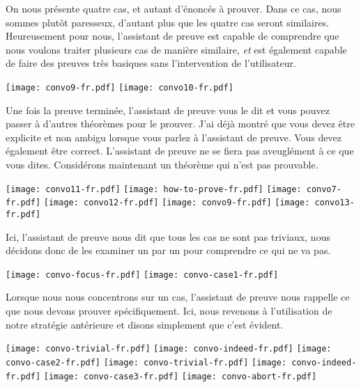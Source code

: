 On nous présente quatre cas, et autant d'énoncés à prouver.
Dans ce cas, nous sommes plutôt paresseux, d'autant plus que les quatre cas
seront similaires. Heureusement pour nous, l'assistant de preuve est capable de
comprendre que nous voulons traiter plusieurs cas de manière similaire,
\emph{et} est également capable de faire des preuves très basiques sans
l'intervention de l'utilisateur.

\begin{center}
  \texttt{[image: convo9-fr.pdf]}
  \texttt{[image: convo10-fr.pdf]}
\end{center}

Une fois la preuve terminée, l'assistant de preuve vous le dit et vous pouvez
passer à d'autres théorèmes pour le prouver. J'ai déjà montré que vous devez
être explicite et non ambigu lorsque vous parlez à l'assistant de preuve. Vous
devez également être correct.
L'assistant de preuve ne se fiera pas aveuglément à ce que vous dites.
%
Considérons maintenant un théorème qui n'est pas prouvable.

\begin{center}
  \texttt{[image: convo11-fr.pdf]}
  \texttt{[image: how-to-prove-fr.pdf]}
  \texttt{[image: convo7-fr.pdf]}
  \texttt{[image: convo12-fr.pdf]}
  \texttt{[image: convo9-fr.pdf]}
  \texttt{[image: convo13-fr.pdf]}
\end{center}

Ici, l'assistant de preuve nous dit que tous les cas ne sont pas triviaux, nous
décidons donc de les examiner un par un pour comprendre ce qui ne va pas.

\begin{center}
  \texttt{[image: convo-focus-fr.pdf]}
  \texttt{[image: convo-case1-fr.pdf]}
\end{center}

Lorsque nous nous concentrons sur un cas, l'assistant de preuve nous rappelle ce
que nous devons prouver spécifiquement. Ici, nous revenons à l'utilisation de
notre stratégie antérieure et disons simplement que c'est évident.

\begin{center}
  \texttt{[image: convo-trivial-fr.pdf]}
  \texttt{[image: convo-indeed-fr.pdf]}
  \texttt{[image: convo-case2-fr.pdf]}
  \texttt{[image: convo-trivial-fr.pdf]}
  \texttt{[image: convo-indeed-fr.pdf]}
  \texttt{[image: convo-case3-fr.pdf]}
  \texttt{[image: convo-abort-fr.pdf]}
\end{center}


